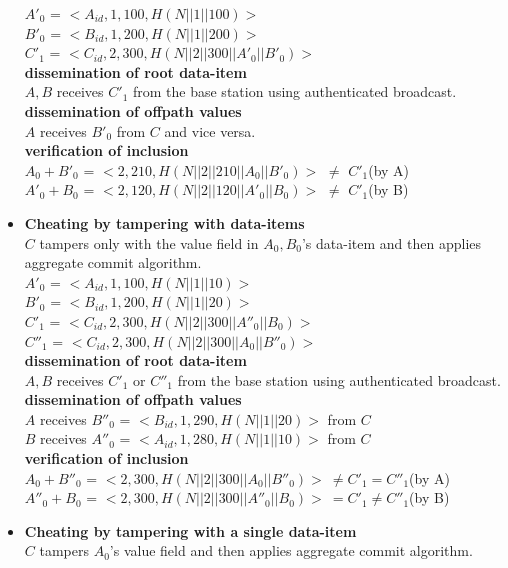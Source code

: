 \begin{exmp}
\begin{itemize}
		$A'_{0}$ = $<A_{id},1,100, H(N||1||100)>$\\
		$B'_{0}$ = $<B_{id},1,200, H(N||1||200)>$\\
		$C'_{1}$ = $<C_{id},2,300, H(N||2||300||A'_{0}||B'_{0})>$\\
		\textbf{dissemination of root data-item}\\
			$A,B$ receives $C'_{1}$ from the base station using authenticated broadcast.\\
		\textbf{dissemination of offpath values}\\
			$A$ receives $B'_{0}$ from $C$ and vice versa.\\
		\textbf{verification of inclusion}\\
			$A_{0}+B'_{0}$ = $<2,210,H(N||2||210||A_{0}||B'_{0})>$ $\neq$ $C'_{1}$(by A)\\
			$A'_{0}+B_{0}$ = $<2,120,H(N||2||120||A'_{0}||B_{0})>$ $\neq$ $C'_{1}$(by B)
	\item \textbf{Cheating by tampering with data-items}\\
		$C$ tampers only with the value field in $A_{0},B_{0}$'s data-item and then applies aggregate commit algorithm.\\
		$A'_{0}$ = $<A_{id},1,100, H(N||1||10)>$\\
		$B'_{0}$ = $<B_{id},1,200, H(N||1||20)>$\\
		$C'_{1}$ = $<C_{id},2,300, H(N||2||300||A''_{0}||B_{0})>$\\
		$C''_{1}$ = $<C_{id},2,300, H(N||2||300||A_{0}||B''_{0})>$\\
		\textbf{dissemination of root data-item}\\
		$A,B$ receives $C'_{1}$ or $C''_{1}$ from the base station using authenticated broadcast.\\
		\textbf{dissemination of offpath values}\\
		$A$ receives $B''_{0}$ = $<B_{id},1,290,H(N||1||20)>$ from $C$\\
		$B$ receives $A''_{0}$ = $<A_{id},1,280,H(N||1||10)>$ from $C$\\
		\textbf{verification of inclusion}\\
		$A_{0}+B''_{0}$ = $<2,300,H(N||2||300||A_{0}||B''_{0})>\  \neq C'_{1} = C''_{1}$(by A)\\
		$A''_{0}+B_{0}$ = $<2,300,H(N||2||300||A''_{0}||B_{0})>\  = C'_{1} \neq C''_{1}$(by B)
	\item \textbf{Cheating by tampering with a single data-item}\\
		$C$ tampers $A_{0}$'s value field and then applies aggregate commit algorithm.\\

\end{itemize}
\end{exmp}
